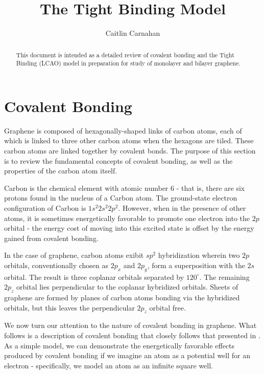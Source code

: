 \documentclass{article}
\title{The Tight Binding Model}
\author{Caitlin Carnahan}
\begin{document}
\maketitle
\begin{abstract}
This document is intended as a detailed review of covalent bonding and the Tight Binding (LCAO) model in preparation for study of monolayer and bilayer graphene.
\end{abstract}
\section{Covalent Bonding}
Graphene is composed of hexagonally-shaped links of carbon atoms, each of which is linked to three other carbon atoms when the hexagons are tiled. These carbon atoms are linked together by covalent bonds.
The purpose of this section is to review the fundamental concepts of covalent bonding, as well as the properties of the carbon atom itself. \par
Carbon is the chemical element with atomic number 6 - that is, there are six protons found in the nucleus of a Carbon atom. The ground-state electron configuration of Carbon is $1s^{2}2s^{2}2p^{2}$. However, when in the presence of other atoms,
it is sometimes energetically favorable to promote one electron into the $2p$ orbital - the energy cost of moving into this excited state is offset by the energy gained from covalent bonding. \par
In the case of graphene, carbon atoms exibit $sp^{2}$ hybridization wherein two $2p$ orbitals, conventionally chosen as $2p_{x}$ and $2p_{y}$, form a superposition with the $2s$ orbital. The result is three coplanar orbitals separated by $120^{\circ}$.
The remaining $2p_{z}$ orbital lies perpendicular to the coplanar hybridized orbitals. Sheets of graphene are formed by planes of carbon atoms bonding via the hybridized orbitals, but this leaves the perpendicular $2p_{z}$ orbital free. \par
We now turn our attention to the nature of covalent bonding in graphene. What follows is a description of covalent bonding that closely follows that presented in \cite{oxford}. As a simple model, we can demonstrate the energetically favorable effects
produced by covalent bonding if we imagine an atom as a potential well for an electron - specifically, we model an atom as an infinite square well.
\end{document}
